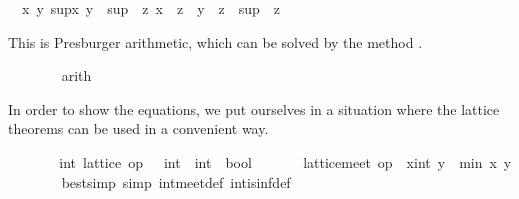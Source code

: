 \begin{isabellebody}
\begin{isamarkuptxt}
\begin{isabelle}
\ {}{}\ {}x\ y{}\ {}sup{}x{}\ y\ {}\ sup\ {}\ {}{}z{}\ x\ {}\ z\ {}\ y\ {}\ z\ {}\ sup\ {}\ z{}%
\end{isabelle}
	This is Presburger arithmetic, which can be solved by the
        method .%
\end{isamarkuptxt}%
\isamarkuptrue%
\ \ \ \ \ \ \isamarkupfalse%
\ arith{}%
\begin{isamarkuptxt}%
\normalsize In order to show the equations, we put ourselves
      in a situation where the lattice theorems can be used in a
      convenient way.%
\end{isamarkuptxt}%
\isamarkuptrue%
\ \ \ \ \isamarkupfalse%
\ \isamarkupfalse%
\ int{}\ lattice\ {}op\ {}\ {}{}\ int\ {}\ int\ {}\ bool{}\ \isamarkupfalse%
\isanewline
\ \ \ \ \isamarkupfalse%
\ {}lattice{}meet\ op\ {}\ {}x{}{}int{}\ y\ {}\ min\ x\ y{}\isanewline
\ \ \ \ \ \ \isamarkupfalse%
\ {}bestsimp\ simp{}\ int{}meet{}def\ int{}is{}inf{}def{}\isanewline

\end{isabellebody}
